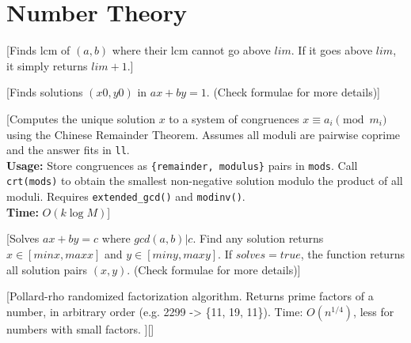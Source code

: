 \chapter{Number Theory}




[Finds lcm of $(a,b)$ where their lcm cannot go above $lim$. 
If it goes above $lim$, it simply returns $lim+1$.]

[Finds solutions $(x0, y0)$ in $ax+by = 1$. (Check formulae for more details)]

[Computes the unique solution $x$ to a system of congruences $x \equiv a_i \pmod{m_i}$ using the Chinese Remainder Theorem. Assumes all moduli are pairwise coprime and the answer fits in \texttt{ll}. \\
\textbf{Usage:} Store congruences as \texttt{\{remainder, modulus\}} pairs in \texttt{mods}. Call \texttt{crt(mods)} to obtain the smallest non-negative solution modulo the product of all moduli. Requires \texttt{extended\_gcd()} and \texttt{modinv()}. \\
\textbf{Time:} {$O(k \log M)$}]

[Solves $ax+by = c$ where $gcd(a,b) | c$. Find any solution returns $x \in [minx, maxx]$ and $y \in [miny, maxy]$. If $solves=true$, 
the function returns all solution pairs $(x,y)$. (Check formulae for more details)]


[Pollard-rho randomized factorization algorithm. Returns prime
 factors of a number, in arbitrary order (e.g. 2299 -> \{11, 19, 11\}).
 Time: $O(n^{1/4})$, less for numbers with small factors.
][]